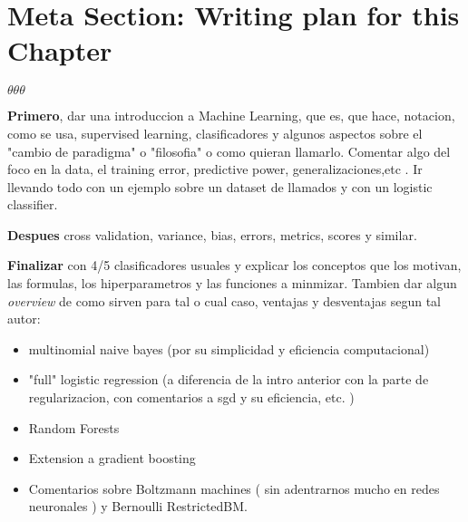 \section{Meta Section: Writing plan for this Chapter}

$\theta \theta \theta $

\textbf{Primero}, dar una introduccion a Machine Learning, que es, que hace, notacion, como se usa, supervised learning, clasificadores y algunos aspectos sobre el "cambio de paradigma" o "filosofia" o como quieran llamarlo. Comentar algo del foco en la data, el training error, predictive power, generalizaciones,etc . Ir llevando todo con un ejemplo sobre un dataset de llamados y con un logistic classifier.

\textbf{Despues} cross validation, variance, bias, errors, metrics, scores y similar.

\textbf{Finalizar} con 4/5 clasificadores usuales y explicar los conceptos que los motivan, las formulas, los hiperparametros y las funciones a minmizar. Tambien dar algun \textit{overview} de como sirven para tal o cual caso, ventajas y desventajas segun tal autor: 
\begin{itemize}
	\item multinomial naive bayes (por su simplicidad y eficiencia computacional)
	\item "full" logistic regression (a diferencia de la intro anterior con la parte de regularizacion, con comentarios a sgd y su eficiencia, etc. )
	\item Random Forests
	\item Extension a gradient boosting
	\item Comentarios sobre Boltzmann machines ( sin adentrarnos mucho en redes neuronales ) y Bernoulli RestrictedBM.
\end{itemize}
